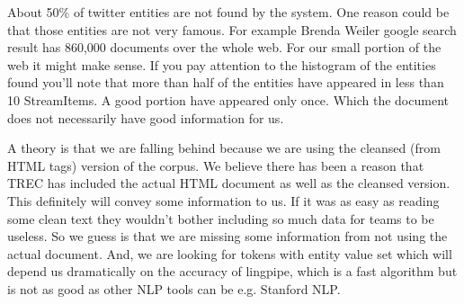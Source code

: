 About 50\% of twitter entities are not found by the system. One reason could be 
that those entities are not very famous. For example Brenda Weiler google 
search result has 860,000 documents over the whole web. For our 
small portion of the web it might make sense. If you pay attention to the 
histogram of the entities found you'll note that more than half of the 
entities have appeared in less than 10 StreamItems. A good portion have 
appeared only once. Which the document does not necessarily have good 
information for us.

A theory is that we are falling behind because we are using the cleansed (from HTML tags)
version of the corpus. We believe there has been a reason that TREC has 
included the actual HTML document as well as the cleansed version. This 
definitely will convey some information to us. If it was as easy as reading 
some clean text they wouldn't bother including so much data for teams to be 
useless. So we guess is that we are missing some information from not using 
the actual document. And, we are looking for tokens with entity value set 
which will depend us dramatically on the accuracy of lingpipe, which is a fast 
algorithm but is not as good as other NLP tools can be e.g. Stanford NLP.


